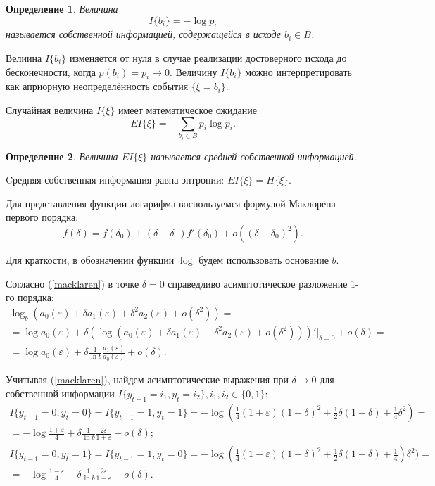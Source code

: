 \documentclass[a4paper,12pt]{article}
\theoremstyle{plain}
\newtheorem{definition}{Определение}[section]
\begin{document}
\begin{definition} \cite{duhin} 
	Величина 
	\begin{equation}\label{own:information}I\{b_i\}=-\log p_i
	\end{equation}
	называется собственной информацией, содержащейся в исходе $b_i \in B$. 
\end{definition}
Велиина $I\{b_i\}$ изменяется от нуля в случае
реализации достоверного исхода до бесконечности, когда $p(b_i)=p_i\rightarrow 0$.
Величину $I\{b_i\}$ можно интерпретировать как априорную неопределённость события $\{\xi=b_i\}$.

Случайная величина $I\{\xi\}$ имеет математическое ожидание
\begin{equation}
	EI\{\xi\}=-\sum_{b_i \in B}p_i\log p_i.
\end{equation}

\begin{definition}
	Величина $EI\{\xi\}$ называется средней собственной информацией.
\end{definition}
Cредняя собственная информация равна энтропии: $EI\{\xi\}=H\{\xi\}$.

Для представления функции логарифма воспользуемся формулой Маклорена первого порядка:
\begin{equation}\label{macklaren}
	f(\delta)=f(\delta_0)+(\delta-\delta_0)f'(\delta_0)+o((\delta-\delta_0)^2).
\end{equation}

Для краткости, в обозначении функции $\log$ будем использовать основание $b$. 

Согласно (\ref{macklaren}) в точке $\delta=0$ справедливо асимптотическое разложение 1-го порядка:
\begin{gather*}
	\log_b(a_0(\varepsilon)+\delta a_1(\varepsilon) + \delta^2 a_2(\varepsilon) + o(\delta^2)) = \\ =
	\log a_0(\varepsilon)+\delta \left(\log(a_0(\varepsilon)+\delta a_1(\varepsilon) + \delta^2 a_2(\varepsilon) + o(\delta^2))\right)'|_{\delta=0} + o(\delta)= \\=
	\log a_0(\varepsilon) +\delta \frac{1}{\ln b}\frac{a_1(\varepsilon)}{a_0(\varepsilon)}+o(\delta).
\end{gather*}

Учитывая (\ref{macklaren}), найдем асимптотические выражения при $\delta \rightarrow 0$ для собственной информации $I\{y_{t-1}=i_1, y_t = i_2 \}, i_1,i_2 \in \{0,1\}$:
\begin{gather*}
	I\{y_{t-1}=0, y_t = 0 \}=I\{y_{t-1}=1, y_t = 1 \}= -\log(\frac{1}{4}(1+\varepsilon)(1-\delta)^2+\frac{1}{2}\delta(1-\delta)+\frac{1}{4}\delta^2) =\\=
	-\log \frac{1+\varepsilon}{4} + \delta \frac{1}{\ln b}\frac{2\varepsilon}{1+\varepsilon} + o(\delta);
	\\
	I\{y_{t-1}=0, y_t = 1 \}=I\{y_{t-1}=1, y_t = 0 \}= -\log(\frac{1}{4}(1-\varepsilon)(1-\delta)^2+\frac{1}{2}\delta(1-\delta)+\frac{1}{4})\delta^2) =\\= 
	-\log \frac{1-\varepsilon}{4} - \delta \frac{1}{\ln b}\frac{2\varepsilon}{1-\varepsilon} + o(\delta).
\end{gather*}
\end{document}
